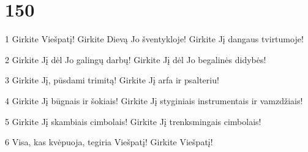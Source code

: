 \chapter{150}


\par 1 Girkite Viešpatį! Girkite Dievą Jo šventykloje! Girkite Jį dangaus tvirtumoje! 
\par 2 Girkite Jį dėl Jo galingų darbų! Girkite Jį dėl Jo begalinės didybės! 
\par 3 Girkite Jį, pūsdami trimitą! Girkite Jį arfa ir psalteriu! 
\par 4 Girkite Jį būgnais ir šokiais! Girkite Jį styginiais instrumentais ir vamzdžiais! 
\par 5 Girkite Jį skambiais cimbolais! Girkite Jį trenksmingais cimbolais! 
\par 6 Visa, kas kvėpuoja, tegiria Viešpatį! Girkite Viešpatį!





